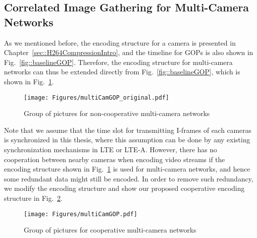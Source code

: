 {%
%
\subsection{Correlated Image Gathering for Multi-Camera Networks}
As we mentioned before, the encoding structure for a camera is presented in Chapter~\ref{sec::H264CompressionIntro}, and the timeline for GOPs is also shown in Fig.~\ref{fig::baselineGOP}.
Therefore, the encoding structure for multi-camera networks can thus be extended directly from Fig.~\ref{fig::baselineGOP}, which is shown in Fig.~\ref{fig::multiCamGOP_original}.
%
\begin{figure}
\begin{center}
\texttt{[image: Figures/multiCamGOP\_original.pdf]}
\caption{\label{fig::multiCamGOP_original}Group of pictures for non-cooperative multi-camera networks}
\end{center}
\end{figure}
%
Note that we assume that the time slot for transmitting I-frames of each cameras is synchronized in this thesis, where this assumption can be done by any existing synchronization mechanisms in LTE or LTE-A.
However, there has no cooperation between nearby cameras when encoding video streams if the encoding structure shown in Fig.~\ref{fig::multiCamGOP_original} is used for multi-camera networks, and hence some redundant data might still be encoded.
In order to remove such redundancy, we modify the encoding structure and show our proposed cooperative encoding structure in Fig.~\ref{fig::multiCamGOP}.
%
\begin{figure}
\begin{center}
\texttt{[image: Figures/multiCamGOP.pdf]}
\caption{\label{fig::multiCamGOP}Group of pictures for cooperative multi-camera networks}
\end{center}
\end{figure}
%

}

